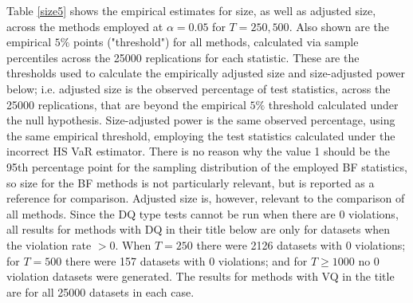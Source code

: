 \documentclass[12pt,epsf]{article}
\begin{document}
Table \ref{size5} shows the empirical estimates for size, as well as adjusted size, across the methods employed at
$\alpha=0.05$ for $T=250,500$. Also shown are the empirical $5\%$ points ("threshold") for all methods, calculated via
sample percentiles across the 25000 replications for each statistic. These are the thresholds used to calculate the
empirically adjusted size and size-adjusted power below; i.e. adjusted size is the observed percentage
of test statistics, across the 25000 replications, that are beyond the empirical $5\%$ threshold calculated under the null hypothesis.
Size-adjusted power is the same observed percentage, using the same empirical threshold, employing the test statistics calculated under the
incorrect HS VaR estimator. There is no reason why the value 1 should be the 95th percentage point for the sampling distribution of the
employed BF statistics, so size for the BF methods is not particularly relevant, but is reported as a reference for comparison.
Adjusted size is, however, relevant to the comparison of all methods. Since the DQ type tests cannot be run when there are 0 violations,
all results for methods with DQ in their title below are only for datasets when the violation rate $>0$. When $T=250$ there were 2126
datasets with 0 violations; for $T = 500$ there were 157 datasets with 0 violations; and for $T \ge 1000$ no 0 violation datasets 
were generated. The results for methods with VQ in the title are for all 25000 datasets in each case.
\end{document}
